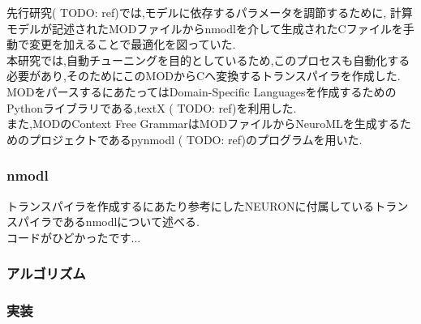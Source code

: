 先行研究( TODO: ref)では,モデルに依存するパラメータを調節するために,
計算モデルが記述されたMODファイルからnmodlを介して生成されたCファイルを手動で変更を加えることで最適化を図っていた.\\
本研究では,自動チューニングを目的としているため,このプロセスも自動化する必要があり,そのためにこのMODからCへ変換するトランスパイラを作成した.\\
MODをパースするにあたってはDomain-Specific Languagesを作成するためのPythonライブラリである,textX ( TODO: ref)を利用した.\\
また,MODのContext Free GrammarはMODファイルからNeuroMLを生成するためのプロジェクトであるpynmodl ( TODO: ref)のプログラムを用いた.\\

\subsubsection{nmodl}
トランスパイラを作成するにあたり参考にしたNEURONに付属しているトランスパイラであるnmodlについて述べる.\\
コードがひどかったです...

\subsubsection{アルゴリズム}

\subsubsection{実装}

